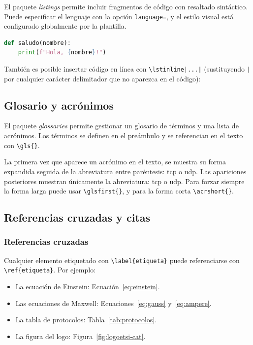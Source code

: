 El paquete \textit{listings} permite incluir fragmentos de código con resaltado sintáctico. Puede especificar el lenguaje con la opción \lstinline{language=}, y el estilo visual está configurado globalmente por la plantilla.

\begin{lstlisting}[language=Python, caption={Mi código en Python}, label={code:mifuncion}]
def saludo(nombre):
    print(f"Hola, {nombre}!")
\end{lstlisting}

También es posible insertar código en línea con \lstinline`\lstinline|...|` (sustituyendo \lstinline{|} por cualquier carácter delimitador que no aparezca en el código):

\subsection{Glosario y acrónimos}

El paquete \textit{glossaries} permite gestionar un glosario de términos y una lista de acrónimos. Los términos se definen en el preámbulo y se referencian en el texto con \lstinline|\gls{}|.

La primera vez que aparece un acrónimo en el texto, se muestra su forma expandida seguida de la abreviatura entre paréntesis: \gls{tcp} o \gls{udp}. Las apariciones posteriores muestran únicamente la abreviatura: \gls{tcp} o \gls{udp}. Para forzar siempre la forma larga puede usar \lstinline|\glsfirst{}|, y para la forma corta \lstinline|\acrshort{}|.

\subsection{Referencias cruzadas y citas}

\subsubsection*{Referencias cruzadas}

Cualquier elemento etiquetado con \lstinline|\label{etiqueta}| puede referenciarse con \lstinline|\ref{etiqueta}|. Por ejemplo:

\begin{itemize}\itemsep 0em
    \item La ecuación de Einstein: Ecuación~\ref{eq:einstein}.
    \item Las ecuaciones de Maxwell: Ecuaciones~\ref{eq:gauss} y~\ref{eq:ampere}.
    \item La tabla de protocolos: Tabla~\ref{tab:protocolos}.
    \item La figura del logo: Figura~\ref{fig:logoetsi-cat}.
\end{itemize}

